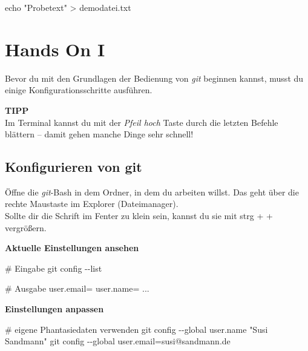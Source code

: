 \documentclass[
  letterpaper,
  DIV=11]{scrreprt}
\newenvironment{Shaded}{\begin{snugshade}}{\end{snugshade}}
\newcommand{\AttributeTok}[1]{\textcolor[rgb]{0.40,0.45,0.13}{#1}}
\newcommand{\BuiltInTok}[1]{\textcolor[rgb]{0.00,0.23,0.31}{#1}}
\newcommand{\CommentTok}[1]{\textcolor[rgb]{0.37,0.37,0.37}{#1}}
\newcommand{\ExtensionTok}[1]{\textcolor[rgb]{0.00,0.23,0.31}{#1}}
\newcommand{\FunctionTok}[1]{\textcolor[rgb]{0.28,0.35,0.67}{#1}}
\newcommand{\NormalTok}[1]{\textcolor[rgb]{0.00,0.23,0.31}{#1}}
\newcommand{\OperatorTok}[1]{\textcolor[rgb]{0.37,0.37,0.37}{#1}}
\newcommand{\StringTok}[1]{\textcolor[rgb]{0.13,0.47,0.30}{#1}}
\newcommand{\git}{\textit{git}\xspace}
\newcommand{\strg}[1]{strg + #1\xspace}
\begin{document}
\begin{Shaded}
\begin{Highlighting}[]
\BuiltInTok{echo} \StringTok{"Probetext"} \OperatorTok{\textgreater{}}\NormalTok{ demodatei.txt }
\end{Highlighting}
\end{Shaded}


\chapter{Hands On I}\label{hands-on-i}

Bevor du mit den Grundlagen der Bedienung von \git  beginnen kannst,
musst du einige Konfigurationsschritte ausführen.

\samplestart

\textbf{TIPP}\\
Im Terminal kannst du mit der \emph{Pfeil hoch} Taste durch die letzten
Befehle blättern -- damit gehen manche Dinge sehr schnell! \sampleend

\section{Konfigurieren von git}\label{konfigurieren-von-git}

Öffne die \git-Bash in dem Ordner, in dem du arbeiten willst. Das geht
über die rechte Maustaste im Explorer (Dateimanager).\\
Sollte dir die Schrift im Fenter zu klein sein, kannst du sie mit
\strg{+} vergrößern.

\textbf{Aktuelle Einstellungen ansehen}

\begin{Shaded}
\begin{Highlighting}[]
\CommentTok{\# Eingabe}
\FunctionTok{git}\NormalTok{ config }\AttributeTok{{-}{-}list}

\CommentTok{\# Ausgabe}
\ExtensionTok{user.email=}
\ExtensionTok{user.name=}
     \ExtensionTok{...}
\end{Highlighting}
\end{Shaded}

\textbf{Einstellungen anpassen}

\begin{Shaded}
\begin{Highlighting}[]
\CommentTok{\# eigene Phantasiedaten verwenden}
\FunctionTok{git}\NormalTok{ config }\AttributeTok{{-}{-}global}\NormalTok{ user.name }\StringTok{"Susi Sandmann"} 
\FunctionTok{git}\NormalTok{ config }\AttributeTok{{-}{-}global}\NormalTok{ user.email=susi@sandmann.de}
\end{Highlighting}
\end{Shaded}
\end{document}
